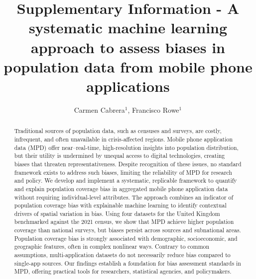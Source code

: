 \documentclass[]{rsos}%
\begin{document}
\title{Supplementary Information - A systematic machine learning approach to assess biases in population data from mobile phone applications}

\author{
Carmen Cabrera$^{1}$,
Francisco Rowe$^{1}$}

\address{
  $^{1}$Geographic Data Science Lab, Department of Geography and Planning, University of Liverpool, Liverpool, United Kingdom.\\
  $^{}$}
\subject{
Mobile phone data,
Human mobility,
Explainable AI,
Spatial analysis}



\begin{abstract}
Traditional sources of population data, such as censuses and surveys, are costly, infrequent, and often unavailable in crisis-affected regions. Mobile phone application data (MPD) offer near--real-time, high-resolution insights into population distribution, but their utility is undermined by unequal access to digital technologies, creating biases that threaten representativeness. Despite recognition of these issues, no standard framework exists to address such biases, limiting the reliability of MPD for research and policy. We develop and implement a systematic, replicable framework to quantify and explain population coverage bias in aggregated mobile phone application data without requiring individual-level attributes. The approach combines an indicator of population coverage bias with explainable machine learning to identify contextual drivers of spatial variation in bias. Using four datasets for the United Kingdom benchmarked against the 2021 census, we show that MPD achieve higher population coverage than national surveys, but biases persist across sources and subnational areas. Population coverage bias is strongly associated with demographic, socioeconomic, and geographic features, often in complex nonlinear ways. Contrary to common assumptions, multi-application datasets do not necessarily reduce bias compared to single-app sources. Our findings establish a foundation for bias assessment standards in MPD, offering practical tools for researchers, statistical agencies, and policymakers.
\end{abstract}
\end{document}
